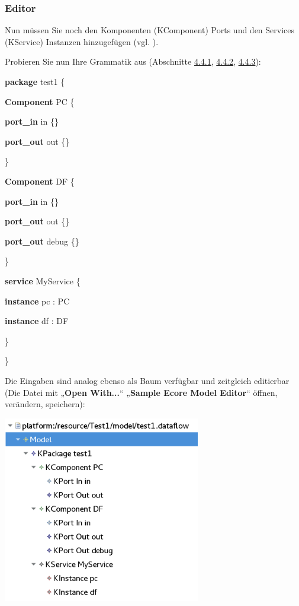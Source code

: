 \documentclass[a4]{article}
\begin{document}
\subsubsection[Editor]{\texorpdfstring{\protect\hypertarget{anchor-26}{}{}Editor}{Editor}}\label{editor}

Nun müssen Sie noch den Komponenten (KComponent) Ports und den Services
(KService) Instanzen hinzugefügen (vgl. ).

Probieren Sie nun Ihre Grammatik aus (Abschnitte
\protect\hyperlink{anchor-24}{4.4.1},
\protect\hyperlink{anchor-25}{4.4.2},
\protect\hyperlink{anchor-26}{4.4.3}):

\textbf{package}
test1 \{

\textbf{Component} PC \{

\textbf{port\_in} in \{\}

\textbf{port\_out} out \{\}

\}

\textbf{Component} DF \{

\textbf{port\_in} in \{\}

\textbf{port\_out} out \{\}

\textbf{port\_out} debug \{\}

\}

\textbf{service} MyService \{

\textbf{instance} pc : PC

\textbf{instance} df : DF

\}

\}

Die Eingaben sind analog ebenso als Baum verfügbar und zeitgleich
editierbar (Die Datei mit „\textbf{Open With...}`` „\textbf{Sample Ecore
Model Editor}`` öffnen, verändern, speichern):

\includegraphics[width=3.39090in,height=3.21610in]{./Pictures/10000201000001BD000001A641C76BF87A14C60B.png}
\end{document}
